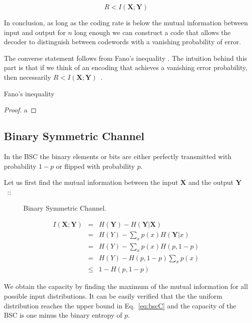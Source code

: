 \begin{equation*}
R < I(\mathbf X;\mathbf Y)
\end{equation*}

In conclusion, as long as the coding rate is below the mutual information between input and output for $n$ long enough we can construct a code that allows the decoder to distinguish between codewords with a vanishing probability of error.

The converse statement follows from Fano's inequality \cite{Fano_61}. The intuition behind this part is that if we think of an encoding that achieves a vanishing error probability, then necessarily $R<I(\mathbf X;\mathbf Y)$~\cite{Cover_91}. 

\begin{theorem}
Fano's inequality
\end{theorem}
\begin{proof}
a
\end{proof}

\subsection{Binary Symmetric Channel}
In the {BSC} the binary elements or bits are either perfectly transmitted with probability $1-p$ or flipped with probability $p$. 

Let us first find the mutual information between the input $\mathbf X$ and the output $\mathbf Y$~\cite{Cover_91}::

\begin{figure}[h]
\begin{center}
\def\svgwidth{\columnwidth} 
 
\caption{Binary Symmetric Channel.}
\label{fig:bsc}
\end{center}
\end{figure}

\begin{eqnarray}
I(\mathbf X;\mathbf Y) &=& H(\mathbf Y) - H(\mathbf Y|\mathbf X) \\
         &=& H(Y) - \sum_x p(x)H(\mathbf Y|x) \\
         &=& H(Y) - \sum_x p(x)H(p,1-p) \\
         &=& H(Y) - H(p,1-p)\sum_x p(x) \\
         &\leq & 1 - H(p,1-p)\label{eq:bscC} 
\end{eqnarray}

We obtain the capacity by finding the maximum of the mutual information for all possible input distributions. It can be easily verified that the the uniform distribution reaches the upper bound in Eq.~\ref{eq:bscC} and the capacity of the {BSC} is one minus the binary entropy of $p$.

